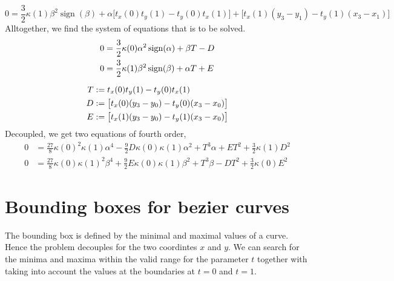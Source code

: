 \documentclass{article}
\newcommand{\sign}{\operatorname{sign}}
\begin{document}
\begin{equation}
  0 = \frac{3}{2}\kappa(1) \beta^2 \sign(\beta)
    + \alpha \bigl[t_x(0)t_y(1) - t_y(0)t_x(1)\bigr]
    + \bigl[t_x(1) (y_3-y_1) - t_y(1) (x_3-x_1)\bigr]
\end{equation}
%
Alltogether, we find the system of equations that is to be solved.
%
\begin{gather}
  \begin{aligned}
    0 &= \frac{3}{2} \kappa(0) \alpha^2 \sign(\alpha) + \beta T - D \\
    0 &= \frac{3}{2} \kappa(1) \beta^2 \sign(\beta) + \alpha T + E
  \end{aligned}\\[\medskipamount]
  \begin{aligned}
    T &:= t_x(0)t_y(1) - t_y(0)t_x(1) \\
    D &:= \bigl[t_x(0) (y_3-y_0) - t_y(0) (x_3-x_0)\bigr]\\
    E &:= \bigl[t_x(1) (y_3-y_0) - t_y(1) (x_3-x_0)\bigr]
  \end{aligned}
\end{gather}
%
Decoupled, we get two equations of fourth order,
%
\begin{align}
  0 &= \frac{27}{8} \kappa(0)^2\kappa(1) \alpha^4
     - \frac{9}{2}D\kappa(0)\kappa(1)\alpha^2
     + T^3 \alpha
     + E T^2 + \frac{3}{2}\kappa(1) D^2 \\
   0 &= \frac{27}{8} \kappa(0)\kappa(1)^2\beta^4
     + \frac{9}{2}E\kappa(0)\kappa(1)\beta^2
     + T^3 \beta
     - D T^2 + \frac{3}{2}\kappa(0) E^2
\end{align}
%

\section{Bounding boxes for bezier curves}

The bounding box is defined by the minimal and maximal values of a
curve. Hence the problem decouples for the two coordintes $x$ and $y$.
We can search for the minima and maxima within the valid range for the
parameter $t$ together with taking into account the values at the
boundaries at $t=0$ and $t=1$.
\end{document}
